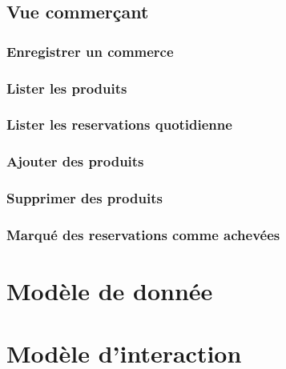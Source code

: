 \documentclass[a4paper,11pt]{article}
\begin{document}
\subsection{Vue commerçant}

\subsubsection{Enregistrer un commerce}

\subsubsection{Lister les produits}

\subsubsection{Lister les reservations quotidienne}

\subsubsection{Ajouter des produits}

\subsubsection{Supprimer des produits}

\subsubsection{Marqué des reservations comme achevées}

\section{Modèle de donnée}

\section{Modèle d'interaction}
\end{document}
